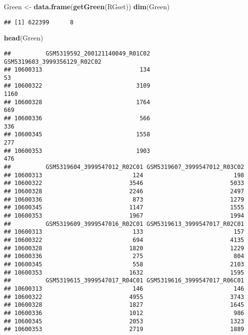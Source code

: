 \documentclass[
]{article}
\newenvironment{Shaded}{\begin{snugshade}}{\end{snugshade}}
\newcommand{\FunctionTok}[1]{\textcolor[rgb]{0.13,0.29,0.53}{\textbf{#1}}}
\newcommand{\NormalTok}[1]{#1}
\newcommand{\OtherTok}[1]{\textcolor[rgb]{0.56,0.35,0.01}{#1}}
\begin{document}
\begin{Shaded}
\begin{Highlighting}[]
\NormalTok{Green }\OtherTok{\textless{}{-}} \FunctionTok{data.frame}\NormalTok{(}\FunctionTok{getGreen}\NormalTok{(RGset))}
\FunctionTok{dim}\NormalTok{(Green)}
\end{Highlighting}
\end{Shaded}

\begin{verbatim}
## [1] 622399      8
\end{verbatim}

\begin{Shaded}
\begin{Highlighting}[]
\FunctionTok{head}\NormalTok{(Green)}
\end{Highlighting}
\end{Shaded}

\begin{verbatim}
##          GSM5319592_200121140049_R01C02 GSM5319603_3999356129_R02C02
## 10600313                            134                           53
## 10600322                           3109                         1160
## 10600328                           1764                          669
## 10600336                            566                          336
## 10600345                           1558                          277
## 10600353                           1903                          476
##          GSM5319604_3999547012_R02C01 GSM5319607_3999547012_R03C02
## 10600313                          124                          198
## 10600322                         3546                         5033
## 10600328                         2246                         2497
## 10600336                          873                         1279
## 10600345                         1147                         1555
## 10600353                         1967                         1994
##          GSM5319609_3999547016_R02C01 GSM5319613_3999547017_R02C01
## 10600313                          133                          157
## 10600322                          694                         4135
## 10600328                         1820                         1229
## 10600336                          275                          804
## 10600345                          558                         2103
## 10600353                         1632                         1595
##          GSM5319615_3999547017_R04C01 GSM5319616_3999547017_R06C01
## 10600313                          146                          146
## 10600322                         4955                         3743
## 10600328                         1827                         1645
## 10600336                         1012                          986
## 10600345                         2053                         1323
## 10600353                         2719                         1889
\end{verbatim}
\end{document}
